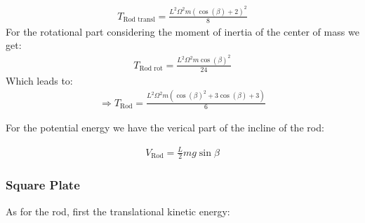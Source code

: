 \begin{equation}
    \begin{split}
        T_\text{Rod transl} = \frac{L^2\Omega ^2m{\left(\cos\left(\beta \right)+2\right)}^2}{8}
    \end{split}
\end{equation}
For the rotational part considering the moment of inertia of the center of mass we get:
\begin{equation}
    \begin{split}
        T_\text{Rod rot} = \frac{L^2\Omega ^2m{\cos\left(\beta \right)}^2}{24}
    \end{split}
\end{equation}
Which leads to:
\begin{equation}
    \begin{split}
        \Rightarrow T_\text{Rod} = \frac{L^2\Omega ^2m\left({\cos\left(\beta \right)}^2+3\cos\left(\beta \right)+3\right)}{6}
    \end{split}
\end{equation}

For the potential energy we have the verical part of the incline of the rod:

\begin{equation}
    \begin{split}
        V_\text{Rod} = \frac{L}{2}mg\sin\beta
    \end{split}
\end{equation}

\subsubsection{Square Plate}
As for the rod, first the translational kinetic energy:

